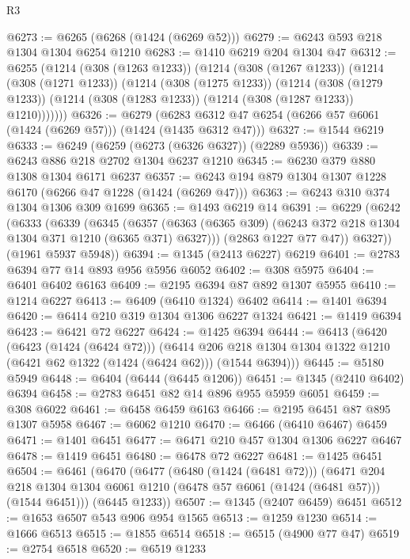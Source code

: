 \begin{lexlean}{R3}
\begin{coremodule}
@6273 := @6265 (@6268 (@1424 (@6269 @52)))
@6279 := @6243 @593 @218 @1304 @1304 @6254 @1210
@6283 := @1410 @6219 @204 @1304 @47
@6312 := @6255
    (@1214
      (@308 (@1263 @1233))
      (@1214
        (@308 (@1267 @1233))
        (@1214
          (@308 (@1271 @1233))
          (@1214
            (@308 (@1275 @1233))
            (@1214
              (@308 (@1279 @1233))
              (@1214 (@308 (@1283 @1233)) (@1214 (@308 (@1287 @1233)) @1210)))))))
@6326 := @6279
    (@6283 @6312 @47 @6254 (@6266 @57 @6061 (@1424 (@6269 @57))) (@1424 (@1435 @6312 @47)))
@6327 := @1544 @6219
@6333 := @6249 (@6259 (@6273 (@6326 @6327)) (@2289 @5936))
@6339 := @6243 @886 @218 @2702 @1304 @6237 @1210
@6345 := @6230 @379 @880 @1308 @1304 @6171 @6237
@6357 := @6243 @194 @879 @1304 @1307 @1228 @6170 (@6266 @47 @1228 (@1424 (@6269 @47)))
@6363 := @6243 @310 @374 @1304 @1306 @309 @1699
@6365 := @1493 @6219 @14
@6391 := @6229
    (@6242
      (@6333
        (@6339
          (@6345
            (@6357 (@6363 (@6365 @309) (@6243 @372 @218 @1304 @1304 @371 @1210 (@6365 @371) @6327)))
            (@2863 @1227 @77 @47))
          @6327))
      (@1961 @5937 @5948))
@6394 := @1345 (@2413 @6227) @6219
@6401 := @2783 @6394 @77 @14 @893 @956 @5956 @6052
@6402 := @308 @5975
@6404 := @6401 @6402 @6163
@6409 := @2195 @6394 @87 @892 @1307 @5955
@6410 := @1214 @6227
@6413 := @6409 (@6410 @1324) @6402
@6414 := @1401 @6394
@6420 := @6414 @210 @319 @1304 @1306 @6227 @1324
@6421 := @1419 @6394
@6423 := @6421 @72 @6227
@6424 := @1425 @6394
@6444 := @6413
    (@6420
      (@6423 (@1424 (@6424 @72)))
      (@6414 @206 @218 @1304 @1304 @1322 @1210 (@6421 @62 @1322 (@1424 (@6424 @62))) (@1544 @6394)))
@6445 := @5180 @5949
@6448 := @6404 (@6444 (@6445 @1206))
@6451 := @1345 (@2410 @6402) @6394
@6458 := @2783 @6451 @82 @14 @896 @955 @5959 @6051
@6459 := @308 @6022
@6461 := @6458 @6459 @6163
@6466 := @2195 @6451 @87 @895 @1307 @5958
@6467 := @6062 @1210
@6470 := @6466 (@6410 @6467) @6459
@6471 := @1401 @6451
@6477 := @6471 @210 @457 @1304 @1306 @6227 @6467
@6478 := @1419 @6451
@6480 := @6478 @72 @6227
@6481 := @1425 @6451
@6504 := @6461
    (@6470
      (@6477
        (@6480 (@1424 (@6481 @72)))
        (@6471
          @204
          @218
          @1304
          @1304
          @6061
          @1210
          (@6478 @57 @6061 (@1424 (@6481 @57)))
          (@1544 @6451)))
      (@6445 @1233))
@6507 := @1345 (@2407 @6459) @6451
@6512 := @1653 @6507 @543 @906 @954 @1565
@6513 := @1259 @1230
@6514 := @1666 @6513
@6515 := @1855 @6514
@6518 := @6515 (@4900 @77 @47)
@6519 := @2754 @6518
@6520 := @6519 @1233

\end{coremodule}
\end{lexlean}
